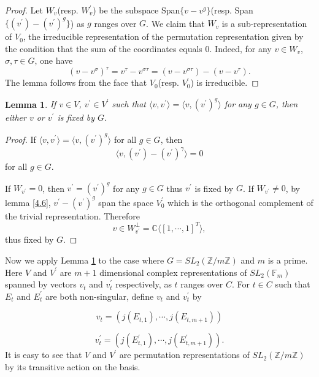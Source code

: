 \documentclass[12pt]{amsart}
\newtheorem{lem}[thm]{Lemma}
\theoremstyle{definition}
\theoremstyle{remark}
\numberwithin{equation}{section}
\newcommand{\F}{\mathbb{F}}
\newcommand{\Z}{\mathbb{Z}}
\begin{document}
\begin{proof}
	Let $W_{v}$(resp. $W^{\prime}_{v}$) be the subspace Span$\{v-v^{g}\}$(resp. Span$\{(v^{\prime})-(v^{\prime})^{g}\}$) as $g$ ranges over $G$. We claim that $W_{v}$ is a sub-representation of $V_{0}$, the irreducible representation of the permutation representation given by the condition that the sum of the coordinates equals $0$. Indeed, for any $v \in W_{v}$, $\sigma, \tau \in G$, one have
	$$(v-v^{\sigma})^{\tau}=v^{\tau}-v^{\sigma\tau}=(v-v^{\sigma\tau})-(v-v^{\tau}).$$
The lemma follows from the face that $V_{0}$(resp. $V^{\prime}_{0}$) is irreducible.
\end{proof}

\begin{lem}\label{sigma}
	If $v \in V$, $v^{\prime} \in V^{\prime}$ such that $\langle v, v^{\prime} \rangle = \langle v, (v^{\prime})^{g} \rangle$ for any $g \in G$, then either $v$ or $v^{\prime}$ is fixed by $G$.
\end{lem}

\begin{proof}
	If $\langle v, v^{\prime} \rangle = \langle v, (v^{\prime})^{g} \rangle$ for all $g \in G$, then 
	 $$\langle v, (v^{\prime}) - (v^{\prime})^{\gamma} \rangle =0$$
	 for all $g \in G.$
	
	If $W_{v^{\prime}}=0$, then $v^{\prime}= (v^{\prime})^{g}$ for any $g \in G$ thus $v^{\prime}$ is fixed by $G$.
	If $W_{v^{\prime}} \ne 0$, by lemma \ref{4.6}, $v^{\prime}- (v^{\prime})^{g}$ span the space $V^{\prime}_{0}$ which is the orthogonal complement of the trivial representation. Therefore $$v \in W_{v^{\prime}}^{\perp}= \mathbb{C}\langle [1, \cdots, 1]^{T} \rangle,$$
	thus fixed by $G$.
	
\end{proof}

\vspace{1em}

Now we apply Lemma \ref{sigma} to the case where $G=SL_{2}(\Z/m\Z)$ and $m$ is a prime. Here $V$ and $V^{\prime}$ are $m+1$ dimensional complex representations of $SL_{2}(\F_m)$ spanned by vectors $v_t$ and $v_{t}^{\prime}$ respectively, as $t$ ranges over $C$. For $t \in C$ such that $E_{t}$ and $E_{t}^{\prime}$ are both non-singular, define $v_t$ and $v_{t}^{\prime}$ by 

\begin{equation}
	v_t =(j(E_{t,1}),\cdots,j(E_{t, m+1}))
\end{equation}

\begin{equation}
	v_{t}^{\prime} = (j(E^{\prime}_{t,1}),\cdots,j(E^{\prime}_{t, m+1})).
\end{equation}
It is easy to see that $V$ and $V^{\prime}$ are permutation representations of $SL_{2}(\Z/m\Z)$ by its transitive action on the basis. 
\end{document}
